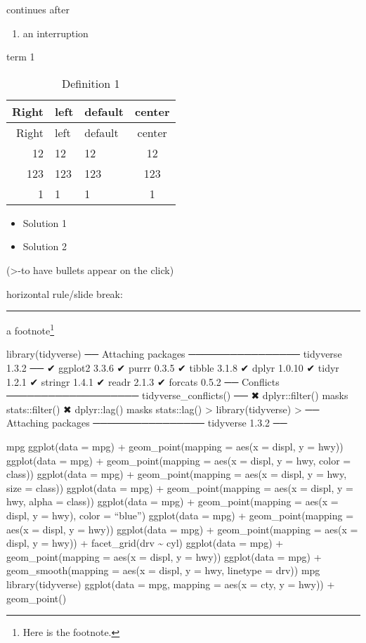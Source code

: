 \documentclass[
]{article}
\providecommand{\tightlist}{%
  \setlength{\itemsep}{0pt}\setlength{\parskip}{0pt}}
\begin{document}
continues after

\begin{enumerate}
\def\labelenumi{(\arabic{enumi})}
\setcounter{enumi}{1}
\tightlist
\item
  an interruption
\end{enumerate}

term 1

\begin{longtable}[]{@{}rllc@{}}
\caption{Definition 1}\tabularnewline
\toprule()
Right & left & default & center \\
\midrule()
\endfirsthead
\toprule()
Right & left & default & center \\
\midrule()
\endhead
12 & 12 & 12 & 12 \\
123 & 123 & 123 & 123 \\
1 & 1 & 1 & 1 \\
\bottomrule()
\end{longtable}

\begin{itemize}
\item
  Solution 1
\item
  Solution 2
\end{itemize}

(\textgreater-to have bullets appear on the click)

horizontal rule/slide break:

\begin{center}\rule{0.5\linewidth}{0.5pt}\end{center}

a footnote\footnote{Here is the footnote.}

library(tidyverse) ── Attaching packages ──────────────── tidyverse
1.3.2 ── ✔ ggplot2 3.3.6 ✔ purrr 0.3.5 ✔ tibble 3.1.8 ✔ dplyr 1.0.10 ✔
tidyr 1.2.1 ✔ stringr 1.4.1 ✔ readr 2.1.3 ✔ forcats 0.5.2 ── Conflicts
─────────────────── tidyverse\_conflicts() ── ✖ dplyr::filter() masks
stats::filter() ✖ dplyr::lag() masks stats::lag() \textgreater{}
library(tidyverse) \textgreater{} ── Attaching packages ────────────────
tidyverse 1.3.2 ──

mpg ggplot(data = mpg) + geom\_point(mapping = aes(x = displ, y = hwy))
ggplot(data = mpg) + geom\_point(mapping = aes(x = displ, y = hwy, color
= class)) ggplot(data = mpg) + geom\_point(mapping = aes(x = displ, y =
hwy, size = class)) ggplot(data = mpg) + geom\_point(mapping = aes(x =
displ, y = hwy, alpha = class)) ggplot(data = mpg) + geom\_point(mapping
= aes(x = displ, y = hwy), color = ``blue'') ggplot(data = mpg) +
geom\_point(mapping = aes(x = displ, y = hwy)) ggplot(data = mpg) +
geom\_point(mapping = aes(x = displ, y = hwy)) + facet\_grid(drv
\textasciitilde{} cyl) ggplot(data = mpg) + geom\_point(mapping = aes(x
= displ, y = hwy)) ggplot(data = mpg) + geom\_smooth(mapping = aes(x =
displ, y = hwy, linetype = drv)) mpg library(tidyverse) ggplot(data =
mpg, mapping = aes(x = cty, y = hwy)) + geom\_point()
\end{document}
